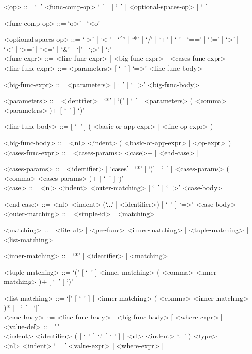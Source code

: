 \documentclass{article}
\begin{document}
\begin{grammar}
<op> ::= `\ ' <func-comp-op> `\ ' | [ `\ ' ] <optional-spaces-op> [ `\ ' ]

<func-comp-op> ::= `o>' | `<o'

<optional-spaces-op> ::=
`->' | `<-' | `^' | `*' | `/' | `+' | `-' | `==' | `!=' | `>' | `<' | `>=' |
`<=' | `\&' | `|' | `;>' | `;'
\\

\newpage
<func-expr> ::= <line-func-expr> | <big-func-expr> | <cases-func-expr>
\\

<line-func-expr> ::= <parameters> [ `\ ' ] `=>' <line-func-body>

<big-func-expr> ::= <parameters> [ `\ ' ] `=>' <big-func-body>

<parameters> ::=
<identifier> | `*' |
`(' [ `\ ' ] <parameters> ( <comma> <parameters> )+ [ `\ ' ] `)'

<line-func-body> ::= [ `\ ' ] ( <basic-or-app-expr> | <line-op-expr> )

<big-func-body> ::= <nl> <indent> ( <basic-or-app-expr> | <op-expr> )
\\

<cases-func-expr> ::= <cases-params> <case>+ [ <end-case> ]

<cases-params> ::=
<identifier> | `cases' | `*' |
`(' [ `\ ' ] <cases-params> ( <comma> <cases-params> )+ [ `\ ' ] `)'
\\

<case> ::=  <nl> <indent> <outer-matching> [ `\ ' ] `=>' <case-body>

<end-case> ::=
<nl> <indent> (`...' | <identifier>) [ `\ ' ] `=>' <case-body>
\\

<outer-matching> ::= <simple-id> | <matching>

<matching> ::=
<literal> | <pre-func> <inner-matching> | <tuple-matching> | <list-matching>

<inner-matching> ::= `*' | <identifier> | <matching>

<tuple-matching> ::=
`(' [ `\ ' ] <inner-matching> ( <comma> <inner-matching> )+ [ `\ ' ] `)'

<list-matching> ::=
`[' [ `\ ' ] [ <inner-matching> ( <comma> <inner-matching> )* ] [ `\ ' ]
`]'
\\

<case-body> ::= <line-func-body> | <big-func-body> [ <where-expr> ]
\\

<value-def> ::= ""\\
<indent> <identifier>
( [ `\ ' ] `:' [ `\ ' ] | <nl> <indent> `:\ ' ) <type>  \\
<nl> <indent> `=\ ' <value-expr> [ <where-expr> ]


\end{grammar}
\end{document}
